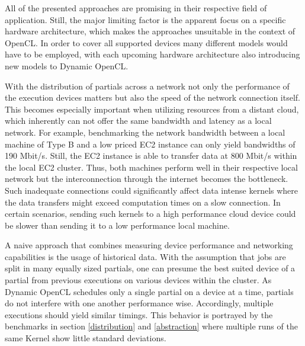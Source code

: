 All of the presented approaches are promising in their respective field of application. Still, the major limiting factor is the apparent focus on a specific hardware architecture, which makes the approaches unsuitable in the context of OpenCL. In order to cover all supported devices many different models would have to be employed, with each upcoming hardware architecture also introducing new models to Dynamic OpenCL.

With the distribution of partials across a network not only the performance of the execution devices matters but also the speed of the network connection itself. This becomes especially important when utilizing resources from a distant cloud, which inherently can not offer the same bandwidth and latency as a local network. For example, benchmarking the network bandwidth between a local machine of Type B and a low priced EC2 instance can only yield bandwidths of 190 Mbit/s. Still, the EC2 instance is able to transfer data at 800 Mbit/s within the local EC2 cluster. Thus, both machines perform well in their respective local network but the interconnection through the internet becomes the bottleneck. Such inadequate connections could significantly affect data intense kernels where the data transfers might exceed computation times on a slow connection. In certain scenarios, sending such kernels to a high performance cloud device could be slower than sending it to a low performance local machine.

A naive approach that combines measuring device performance and networking capabilities is the usage of historical data. With the assumption that jobs are split in many equally sized partials, one can presume the best suited device of a partial from previous executions on various devices within the cluster. As Dynamic OpenCL schedules only a single partial on a device at a time, partials do not interfere with one another performance wise. Accordingly, multiple executions should yield similar timings. This behavior is portrayed by the benchmarks in section \ref{distribution} and \ref{abstraction} where multiple runs of the same Kernel show little standard deviations.

